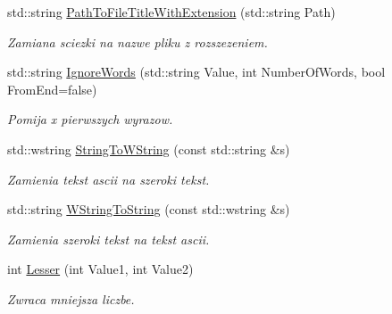 \begin{DoxyCompactItemize}
\mbox{\label{namespacetfp_af3bc59c9f806ada997379c19f65a4f6f}} 
std\+::string \mbox{\hyperlink{namespacetfp_af3bc59c9f806ada997379c19f65a4f6f}{Path\+To\+File\+Title\+With\+Extension}} (std\+::string Path)
\begin{DoxyCompactList}\small\item\em Zamiana sciezki na nazwe pliku z rozszezeniem. \end{DoxyCompactList}\item 
\mbox{\label{namespacetfp_a0efd3fff12615ec230cfa57ab642c18c}} 
std\+::string \mbox{\hyperlink{namespacetfp_a0efd3fff12615ec230cfa57ab642c18c}{Ignore\+Words}} (std\+::string Value, int Number\+Of\+Words, bool From\+End=false)
\begin{DoxyCompactList}\small\item\em Pomija x pierwszych wyrazow. \end{DoxyCompactList}\item 
\mbox{\label{namespacetfp_abe331eca3bd2a3593e3712e987c5ebc7}} 
std\+::wstring \mbox{\hyperlink{namespacetfp_abe331eca3bd2a3593e3712e987c5ebc7}{String\+To\+W\+String}} (const std\+::string \&s)
\begin{DoxyCompactList}\small\item\em Zamienia tekst ascii na szeroki tekst. \end{DoxyCompactList}\item 
\mbox{\label{namespacetfp_af6cc54f41646f819fef58d36e9feac61}} 
std\+::string \mbox{\hyperlink{namespacetfp_af6cc54f41646f819fef58d36e9feac61}{W\+String\+To\+String}} (const std\+::wstring \&s)
\begin{DoxyCompactList}\small\item\em Zamienia szeroki tekst na tekst ascii. \end{DoxyCompactList}\item 
\mbox{\label{namespacetfp_a39bfabc484bbb8655cec59fbf992bc10}} 
int \mbox{\hyperlink{namespacetfp_a39bfabc484bbb8655cec59fbf992bc10}{Lesser}} (int Value1, int Value2)
\begin{DoxyCompactList}\small\item\em Zwraca mniejsza liczbe. \end{DoxyCompactList}\item 
\mbox{\label{namespacetfp_a3e2e2d80cbd9c55a2893f360938adfd7}} 

\end{DoxyCompactItemize}

